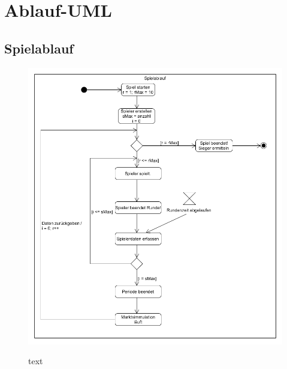 \section{Ablauf-UML}
\subsection{Spielablauf}
\begin{figure} [!h]
	\centering
	\includegraphics[scale=0.5]{img/Spielablauf.png} 
	\label{key}
	\caption{text}
\end{figure}





